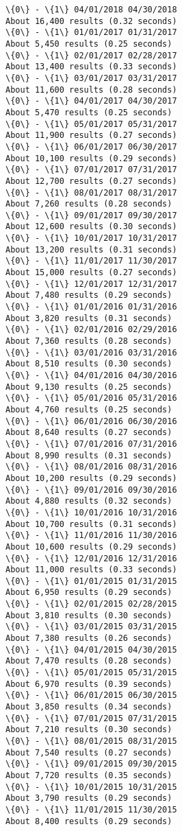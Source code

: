 \documentclass[11pt]{article}
\begin{document}
\begin{Verbatim}[commandchars=\\\{\}]
\{0\} - \{1\} 04/01/2018 04/30/2018
About 16,400 results (0.32 seconds) 
\{0\} - \{1\} 01/01/2017 01/31/2017
About 5,450 results (0.25 seconds) 
\{0\} - \{1\} 02/01/2017 02/28/2017
About 13,400 results (0.33 seconds) 
\{0\} - \{1\} 03/01/2017 03/31/2017
About 11,600 results (0.28 seconds) 
\{0\} - \{1\} 04/01/2017 04/30/2017
About 5,470 results (0.25 seconds) 
\{0\} - \{1\} 05/01/2017 05/31/2017
About 11,900 results (0.27 seconds) 
\{0\} - \{1\} 06/01/2017 06/30/2017
About 10,100 results (0.29 seconds) 
\{0\} - \{1\} 07/01/2017 07/31/2017
About 12,700 results (0.27 seconds) 
\{0\} - \{1\} 08/01/2017 08/31/2017
About 7,260 results (0.28 seconds) 
\{0\} - \{1\} 09/01/2017 09/30/2017
About 12,600 results (0.30 seconds) 
\{0\} - \{1\} 10/01/2017 10/31/2017
About 13,200 results (0.31 seconds) 
\{0\} - \{1\} 11/01/2017 11/30/2017
About 15,000 results (0.27 seconds) 
\{0\} - \{1\} 12/01/2017 12/31/2017
About 7,480 results (0.29 seconds) 
\{0\} - \{1\} 01/01/2016 01/31/2016
About 3,820 results (0.31 seconds) 
\{0\} - \{1\} 02/01/2016 02/29/2016
About 7,360 results (0.28 seconds) 
\{0\} - \{1\} 03/01/2016 03/31/2016
About 8,510 results (0.30 seconds) 
\{0\} - \{1\} 04/01/2016 04/30/2016
About 9,130 results (0.25 seconds) 
\{0\} - \{1\} 05/01/2016 05/31/2016
About 4,760 results (0.25 seconds) 
\{0\} - \{1\} 06/01/2016 06/30/2016
About 8,640 results (0.27 seconds) 
\{0\} - \{1\} 07/01/2016 07/31/2016
About 8,990 results (0.31 seconds) 
\{0\} - \{1\} 08/01/2016 08/31/2016
About 10,200 results (0.29 seconds) 
\{0\} - \{1\} 09/01/2016 09/30/2016
About 4,880 results (0.32 seconds) 
\{0\} - \{1\} 10/01/2016 10/31/2016
About 10,700 results (0.31 seconds) 
\{0\} - \{1\} 11/01/2016 11/30/2016
About 10,600 results (0.29 seconds) 
\{0\} - \{1\} 12/01/2016 12/31/2016
About 11,000 results (0.33 seconds) 
\{0\} - \{1\} 01/01/2015 01/31/2015
About 6,950 results (0.29 seconds) 
\{0\} - \{1\} 02/01/2015 02/28/2015
About 3,810 results (0.30 seconds) 
\{0\} - \{1\} 03/01/2015 03/31/2015
About 7,380 results (0.26 seconds) 
\{0\} - \{1\} 04/01/2015 04/30/2015
About 7,470 results (0.28 seconds) 
\{0\} - \{1\} 05/01/2015 05/31/2015
About 6,970 results (0.39 seconds) 
\{0\} - \{1\} 06/01/2015 06/30/2015
About 3,850 results (0.34 seconds) 
\{0\} - \{1\} 07/01/2015 07/31/2015
About 7,210 results (0.30 seconds) 
\{0\} - \{1\} 08/01/2015 08/31/2015
About 7,540 results (0.27 seconds) 
\{0\} - \{1\} 09/01/2015 09/30/2015
About 7,720 results (0.35 seconds) 
\{0\} - \{1\} 10/01/2015 10/31/2015
About 3,790 results (0.29 seconds) 
\{0\} - \{1\} 11/01/2015 11/30/2015
About 8,400 results (0.29 seconds) 

\end{Verbatim}
\end{document}
